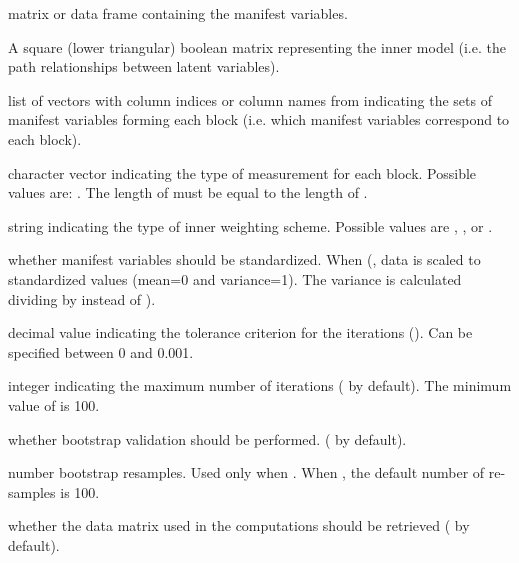 \documentclass[a4paper]{book}
\begin{document}
%
\begin{Arguments}
\begin{ldescription}
\item[\code{Data}] matrix or data frame containing the manifest variables.

\item[\code{path\_matrix}] A square (lower triangular) boolean matrix representing 
the inner model (i.e. the path relationships between latent variables).

\item[\code{blocks}] list of vectors with column indices or column names
from  indicating the sets of manifest variables forming 
each block (i.e. which manifest variables correspond to each block).

\item[\code{modes}] character vector indicating the type of measurement for each
block. Possible values are: . 
The length of  must be equal to the length of .

\item[\code{scheme}] string indicating the type of inner weighting
scheme. Possible values are , , or
.

\item[\code{scaled}] whether manifest variables should be standardized. 
When (, data is 
scaled to standardized values (mean=0 and variance=1). 
The variance is calculated dividing by  instead of ).

\item[\code{tol}] decimal value indicating the tolerance criterion for the
iterations (). Can be specified between 0 and 0.001.

\item[\code{maxiter}] integer indicating the maximum number of iterations
( by default). The minimum value of  is 100.

\item[\code{boot.val}] whether bootstrap validation should be performed. 
( by default).

\item[\code{br}] number bootstrap resamples. Used only
when . When , the default number of 
re-samples is 100.

\item[\code{dataset}] whether the data matrix used in the computations should be
retrieved ( by default).
\end{ldescription}
\end{Arguments}
\end{document}
